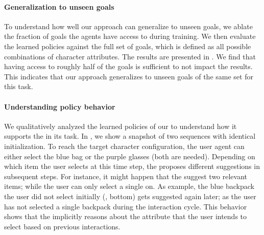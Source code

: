 \paragraph{Generalization to unseen goals} 
To understand how well our approach can generalize to unseen goals, we ablate the fraction of goals the agents have access to during training. We then evaluate the learned policies against the full set of goals, which is defined as all possible combinations of character attributes. 
The results are presented in . We find that having access to roughly half of the goals is sufficient to not impact the results. This indicates that our approach generalizes to unseen goals of the same set for this task. 

\paragraph{Understanding policy behavior}
We qualitatively analyzed the learned policies of our \interfaceagent to understand how it supports the \useragent in its task.
In , we show a snapshot of two sequences with identical initialization. 
To reach the target character configuration, the user agent can either select the blue bag or the purple glasses (both are needed). 
Depending on which item the user selects at this time step, the \interfaceagent proposes different suggestions in subsequent steps. For instance, it might happen that the \interfaceagent suggest two relevant items; while the user can only select a single on. As example, the blue backpack the user did not select initially (, bottom) gets suggested again later; as the user has not selected a single backpack during the interaction cycle.
This behavior shows that the \interfaceagent implicitly reasons about the attribute that the user intends to select based on previous interactions. 


